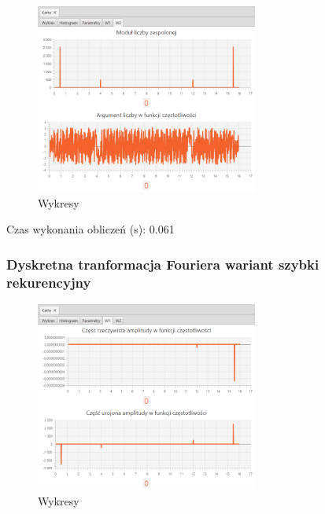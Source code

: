 \documentclass[12pt]{article}
\begin{document}
{{{                \begin{figure}[H]
                    \centering
                    \includegraphics[width=0.65\textwidth]{img/result/s3/02/W2_draw_2_sinus_sampling_trans_s3_data_205904.png}
                    \caption{Wykresy}
                \end{figure}

                Czas wykonania obliczeń (s): 0.061
            }
            \newpage

            \subsubsection{Dyskretna tranformacja Fouriera wariant szybki rekurencyjny} {

                \begin{figure}[H]
                    \centering
                    \includegraphics[width=0.65\textwidth]{img/result/s3/03/W1_draw_3_sinus_sampling_trans_s3_data_205911.png}
                    \caption{Wykresy}
                \end{figure}

}}}
\end{document}
